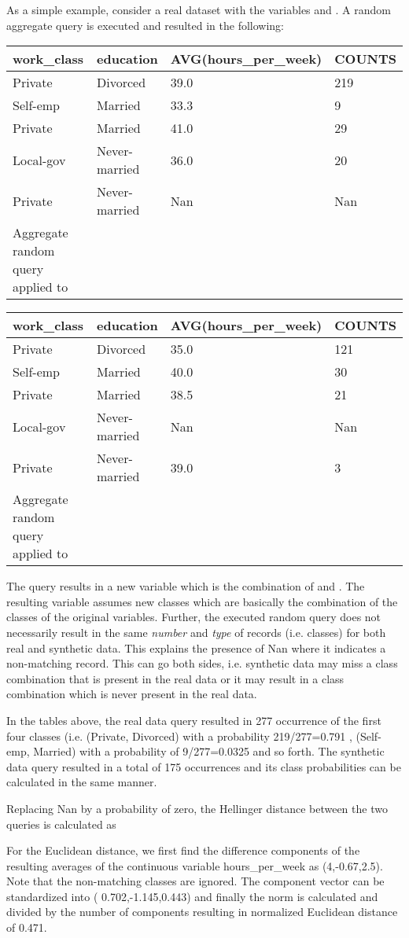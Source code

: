 As a simple example, consider a real dataset with the variables and . A
random aggregate query is executed and resulted in the following:

\begin{longtable}[]{@{}llll@{}}
\toprule
work\_class & education & AVG(hours\_per\_week) & COUNTS\tabularnewline
\midrule
\endhead
Private & Divorced & 39.0 & 219\tabularnewline
Self-emp & Married & 33.3 & 9\tabularnewline
Private & Married & 41.0 & 29\tabularnewline
Local-gov & Never-married & 36.0 & 20\tabularnewline
Private & Never-married & Nan & Nan\tabularnewline
Aggregate random query applied to & & &\tabularnewline
\bottomrule
\end{longtable}

\begin{longtable}[]{@{}llll@{}}
\toprule
work\_class & education & AVG(hours\_per\_week) & COUNTS\tabularnewline
\midrule
\endhead
Private & Divorced & 35.0 & 121\tabularnewline
Self-emp & Married & 40.0 & 30\tabularnewline
Private & Married & 38.5 & 21\tabularnewline
Local-gov & Never-married & Nan & Nan\tabularnewline
Private & Never-married & 39.0 & 3\tabularnewline
Aggregate random query applied to & & &\tabularnewline
\bottomrule
\end{longtable}

The query results in a new variable which is the combination of and .
The resulting variable assumes new classes which are basically the
combination of the classes of the original variables. Further, the
executed random query does not necessarily result in the same
\emph{number} and \emph{type} of records (i.e. classes) for both real
and synthetic data. This explains the presence of Nan where it indicates
a non-matching record. This can go both sides, i.e. synthetic data may
miss a class combination that is present in the real data or it may
result in a class combination which is never present in the real data.

In the tables above, the real data query resulted in 277 occurrence of
the first four classes (i.e. (Private, Divorced) with a probability
219/277=0.791 , (Self-emp, Married) with a probability of 9/277=0.0325
and so forth. The synthetic data query resulted in a total of 175
occurrences and its class probabilities can be calculated in the same
manner.

Replacing Nan by a probability of zero, the Hellinger distance between
the two queries is calculated as

For the Euclidean distance, we first find the difference components of
the resulting averages of the continuous variable hours\_per\_week as
(4,-0.67,2.5). Note that the non-matching classes are ignored. The
component vector can be standardized into ( 0.702,-1.145,0.443) and
finally the norm is calculated and divided by the number of components
resulting in normalized Euclidean distance of 0.471.

